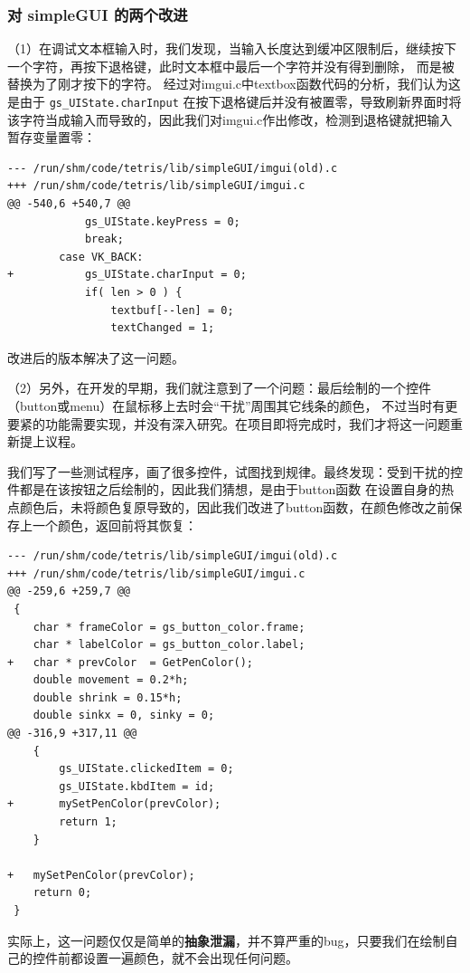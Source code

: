 \documentclass{style/ucasproposal}
\newcommand{\cinline}[1]{\texttt{#1}}
\begin{document}
\subsubsection{对 simpleGUI 的两个改进}

（1）在调试文本框输入时，我们发现，当输入长度达到缓冲区限制后，继续按下一个字符，再按下退格键，此时文本框中最后一个字符并没有得到删除，
而是被替换为了刚才按下的字符。
经过对imgui.c中textbox函数代码的分析，我们认为这是由于 \cinline{gs_UIState.charInput} 在按下退格键后并没有被置零，导致刷新界面时将该字符当成输入而导致的，因此我们对imgui.c作出修改，检测到退格键就把输入暂存变量置零：

\begin{verbatim}
--- /run/shm/code/tetris/lib/simpleGUI/imgui(old).c
+++ /run/shm/code/tetris/lib/simpleGUI/imgui.c
@@ -540,6 +540,7 @@
            gs_UIState.keyPress = 0;
            break;
        case VK_BACK:
+           gs_UIState.charInput = 0;
            if( len > 0 ) {
                textbuf[--len] = 0;
                textChanged = 1;
\end{verbatim}

改进后的版本解决了这一问题。

（2）另外，在开发的早期，我们就注意到了一个问题：最后绘制的一个控件（button或menu）在鼠标移上去时会“干扰”周围其它线条的颜色，
不过当时有更要紧的功能需要实现，并没有深入研究。在项目即将完成时，我们才将这一问题重新提上议程。

我们写了一些测试程序，画了很多控件，试图找到规律。最终发现：受到干扰的控件都是在该按钮之后绘制的，因此我们猜想，是由于button函数
在设置自身的热点颜色后，未将颜色复原导致的，因此我们改进了button函数，在颜色修改之前保存上一个颜色，返回前将其恢复：

\begin{verbatim}
--- /run/shm/code/tetris/lib/simpleGUI/imgui(old).c
+++ /run/shm/code/tetris/lib/simpleGUI/imgui.c
@@ -259,6 +259,7 @@
 {
    char * frameColor = gs_button_color.frame;
    char * labelColor = gs_button_color.label;
+   char * prevColor  = GetPenColor();
    double movement = 0.2*h;
    double shrink = 0.15*h;
    double sinkx = 0, sinky = 0;
@@ -316,9 +317,11 @@
    {
        gs_UIState.clickedItem = 0;
        gs_UIState.kbdItem = id;
+       mySetPenColor(prevColor);
        return 1;
    }

+   mySetPenColor(prevColor);
    return 0;
 }
\end{verbatim}

实际上，这一问题仅仅是简单的\textbf{抽象泄漏}，并不算严重的bug，只要我们在绘制自己的控件前都设置一遍颜色，就不会出现任何问题。
\end{document}
